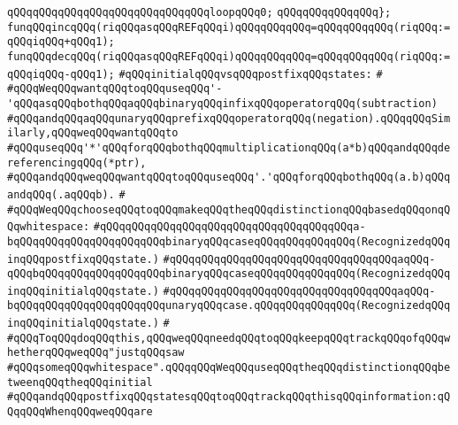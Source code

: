 \newline
\verb|qQQqqQQqqQQqqQQqqQQqqQQqqQQqqQQqloopqQQq0;|\newline
\verb|qQQqqQQqqQQqqQQq};|\newline
\newline
\verb|funqQQqincqQQq(riqQQqasqQQqREFqQQqi)qQQqqQQqqQQq=qQQqqQQqqQQq(riqQQq:=qQQqiqQQq+qQQq1);|\newline
\verb|funqQQqdecqQQq(riqQQqasqQQqREFqQQqi)qQQqqQQqqQQq=qQQqqQQqqQQq(riqQQq:=qQQqiqQQq-qQQq1);|\newline
\newline
\newline
\verb|#qQQqinitialqQQqvsqQQqpostfixqQQqstates:|\newline
\verb|#|\newline
\verb|#qQQqWeqQQqwantqQQqtoqQQquseqQQq'-'qQQqasqQQqbothqQQqaqQQqbinaryqQQqinfixqQQqoperatorqQQq(subtraction)|\newline
\verb|#qQQqandqQQqaqQQqunaryqQQqprefixqQQqoperatorqQQq(negation).qQQqqQQqSimilarly,qQQqweqQQqwantqQQqto|\newline
\verb|#qQQquseqQQq'*'qQQqforqQQqbothqQQqmultiplicationqQQq(a*b)qQQqandqQQqdereferencingqQQq(*ptr),|\newline
\verb|#qQQqandqQQqweqQQqwantqQQqtoqQQquseqQQq'.'qQQqforqQQqbothqQQq(a.b)qQQqandqQQq(.aqQQqb).|\newline
\verb|#|\newline
\verb|#qQQqWeqQQqchooseqQQqtoqQQqmakeqQQqtheqQQqdistinctionqQQqbasedqQQqonqQQqwhitespace:|\newline
\verb|#qQQqqQQqqQQqqQQqqQQqqQQqqQQqqQQqqQQqqQQqa-bqQQqqQQqqQQqqQQqqQQqqQQqbinaryqQQqcaseqQQqqQQqqQQqqQQq(RecognizedqQQqinqQQqpostfixqQQqstate.)|\newline
\verb|#qQQqqQQqqQQqqQQqqQQqqQQqqQQqqQQqqQQqaqQQq-qQQqbqQQqqQQqqQQqqQQqqQQqbinaryqQQqcaseqQQqqQQqqQQqqQQq(RecognizedqQQqinqQQqinitialqQQqstate.)|\newline
\verb|#qQQqqQQqqQQqqQQqqQQqqQQqqQQqqQQqqQQqaqQQq-bqQQqqQQqqQQqqQQqqQQqqQQqunaryqQQqcase.qQQqqQQqqQQqqQQq(RecognizedqQQqinqQQqinitialqQQqstate.)|\newline
\verb|#|\newline
\verb|#qQQqToqQQqdoqQQqthis,qQQqweqQQqneedqQQqtoqQQqkeepqQQqtrackqQQqofqQQqwhetherqQQqweqQQq"justqQQqsaw|\newline
\verb|#qQQqsomeqQQqwhitespace".qQQqqQQqWeqQQquseqQQqtheqQQqdistinctionqQQqbetweenqQQqtheqQQqinitial|\newline
\verb|#qQQqandqQQqpostfixqQQqstatesqQQqtoqQQqtrackqQQqthisqQQqinformation:qQQqqQQqWhenqQQqweqQQqare|\newline
